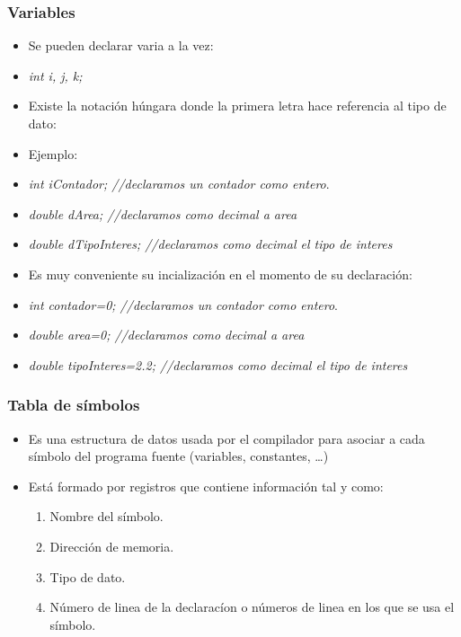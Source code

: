 \documentclass{beamer}
\begin{document}
\begin{frame}
    \frametitle{Variables}

\begin{itemize}[<+-| alert@+>]
	\item Se pueden declarar varia a la vez:
	\item \emph{int i, j, k;}
      \item Existe la notación húngara donde la primera letra hace referencia al tipo de dato:
      \item Ejemplo:
      \item \emph{int iContador; //declaramos un contador como entero}.
      \item \emph{double dArea; //declaramos como decimal a area}
      \item \emph{double dTipoInteres; //declaramos como decimal el tipo de interes} 
      \item Es muy conveniente su incialización en el momento de su declaración:
      \item \emph{int contador=0; //declaramos un contador como entero}.
      \item \emph{double area=0; //declaramos como decimal a area}
      \item \emph{double tipoInteres=2.2; //declaramos como decimal el tipo de interes} 
      \end{itemize}
      \pause

\end{frame}

\begin{frame}
\frametitle{Tabla de símbolos}
\begin{itemize}[<+-| alert@+>]
\item Es una estructura de datos usada por el compilador para asociar a cada símbolo del programa fuente (variables, constantes, \dots)
\item Está formado por registros que contiene información tal y como:
\begin{enumerate}
\item Nombre del símbolo.
\item Dirección de memoria.
\item Tipo de dato.
\item Número de linea de la declaracíon o números de linea en los que se usa el símbolo. 
\end{enumerate}
\end{itemize}
\pause
\end{frame}


\end{document}
